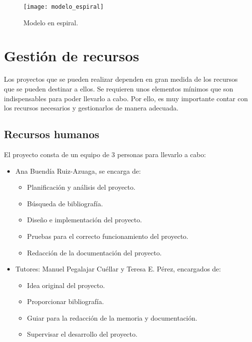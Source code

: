 \begin{figure}
\begin{center}
\caption{Modelo en espiral.}
\label{modelo_espiral}
\texttt{[image: modelo\_espiral]}
\end{center}
\end{figure}

\section{Gestión de recursos}

Los proyectos que se pueden realizar dependen en gran medida de los recursos que se pueden destinar a ellos. Se requieren unos elementos mínimos que son indispensables para poder llevarlo a cabo. Por ello, es muy importante contar con los recursos necesarios y gestionarlos de manera adecuada.

\subsection{Recursos humanos}

El proyecto consta de un equipo de 3 personas para llevarlo a cabo:

\begin{itemize}
\item Ana Buendía Ruiz-Azuaga, se encarga de:
	\begin{itemize}
	\item Planificación y análisis del proyecto.
	\item Búsqueda de bibliografía.
	\item Diseño e implementación del proyecto.
	\item Pruebas para el correcto funcionamiento del proyecto.
	\item Redacción de la documentación del proyecto.
	\end{itemize}
\item Tutores: Manuel Pegalajar Cuéllar y Teresa E. Pérez, encargados de:
	\begin{itemize}
	\item Idea original del proyecto.
	\item Proporcionar bibliografía.
	\item Guiar para la redacción de la memoria y documentación.
	\item Supervisar el desarrollo del proyecto.
	\end{itemize}
\end{itemize}

